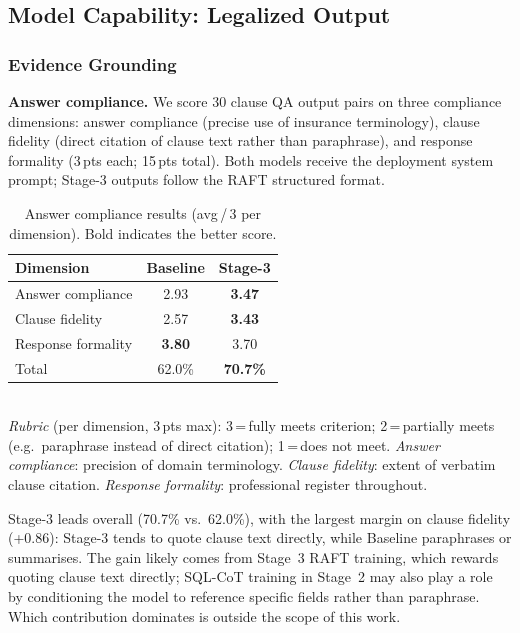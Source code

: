 \documentclass[10pt,conference]{IEEEtran}
\begin{document}
\subsection{Model Capability: Legalized Output}

\subsubsection{Evidence Grounding}

\noindent\textbf{Answer compliance.}
We score 30 clause QA output pairs on three compliance dimensions: answer
compliance (precise use of insurance terminology), clause fidelity (direct
citation of clause text rather than paraphrase), and response formality
(3\,pts each; 15\,pts total).
Both models receive the deployment system prompt; Stage-3 outputs follow the
RAFT structured format.

\begin{table}[htbp]
\centering
\caption{Answer compliance results (avg\,/\,3 per dimension).
Bold indicates the better score.}
\label{tab:compliance}
\small
\begin{tabular}{@{}lcc@{}}
\toprule
Dimension & Baseline & Stage-3 \\
\midrule
Answer compliance   & 2.93 & \textbf{3.47} \\
Clause fidelity     & 2.57 & \textbf{3.43} \\
Response formality  & \textbf{3.80} & 3.70 \\
\midrule
Total               & 62.0\% & \textbf{70.7\%} \\
\bottomrule
\end{tabular}\\[4pt]
{\footnotesize \textit{Rubric} (per dimension, 3\,pts max): 3\,=\,fully meets
criterion; 2\,=\,partially meets (e.g.\ paraphrase instead of direct citation);
1\,=\,does not meet. \emph{Answer compliance}: precision of domain terminology.
\emph{Clause fidelity}: extent of verbatim clause citation.
\emph{Response formality}: professional register throughout.}
\end{table}

Stage-3 leads overall (70.7\% vs.\ 62.0\%), with the largest margin on clause
fidelity (+0.86): Stage-3 tends to quote clause text directly, while Baseline
paraphrases or summarises.
The gain likely comes from Stage~3 RAFT training, which rewards quoting clause
text directly; SQL-CoT training in Stage~2 may also play a role by conditioning
the model to reference specific fields rather than paraphrase.
Which contribution dominates is outside the scope of this work.
\end{document}
